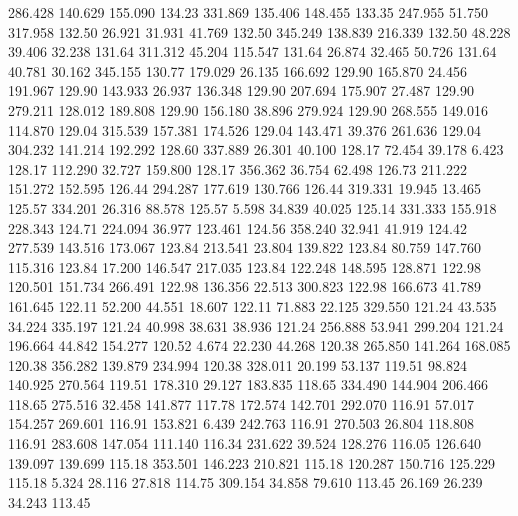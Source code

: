  286.428  140.629  155.090       134.23
 331.869  135.406  148.455       133.35
 247.955   51.750  317.958       132.50
  26.921   31.931   41.769       132.50
 345.249  138.839  216.339       132.50
  48.228   39.406   32.238       131.64
 311.312   45.204  115.547       131.64
  26.874   32.465   50.726       131.64
  40.781   30.162  345.155       130.77
 179.029   26.135  166.692       129.90
 165.870   24.456  191.967       129.90
 143.933   26.937  136.348       129.90
 207.694  175.907   27.487       129.90
 279.211  128.012  189.808       129.90
 156.180   38.896  279.924       129.90
 268.555  149.016  114.870       129.04
 315.539  157.381  174.526       129.04
 143.471   39.376  261.636       129.04
 304.232  141.214  192.292       128.60
 337.889   26.301   40.100       128.17
  72.454   39.178    6.423       128.17
 112.290   32.727  159.800       128.17
 356.362   36.754   62.498       126.73
 211.222  151.272  152.595       126.44
 294.287  177.619  130.766       126.44
 319.331   19.945   13.465       125.57
 334.201   26.316   88.578       125.57
   5.598   34.839   40.025       125.14
 331.333  155.918  228.343       124.71
 224.094   36.977  123.461       124.56
 358.240   32.941   41.919       124.42
 277.539  143.516  173.067       123.84
 213.541   23.804  139.822       123.84
  80.759  147.760  115.316       123.84
  17.200  146.547  217.035       123.84
 122.248  148.595  128.871       122.98
 120.501  151.734  266.491       122.98
 136.356   22.513  300.823       122.98
 166.673   41.789  161.645       122.11
  52.200   44.551   18.607       122.11
  71.883   22.125  329.550       121.24
  43.535   34.224  335.197       121.24
  40.998   38.631   38.936       121.24
 256.888   53.941  299.204       121.24
 196.664   44.842  154.277       120.52
   4.674   22.230   44.268       120.38
 265.850  141.264  168.085       120.38
 356.282  139.879  234.994       120.38
 328.011   20.199   53.137       119.51
  98.824  140.925  270.564       119.51
 178.310   29.127  183.835       118.65
 334.490  144.904  206.466       118.65
 275.516   32.458  141.877       117.78
 172.574  142.701  292.070       116.91
  57.017  154.257  269.601       116.91
 153.821    6.439  242.763       116.91
 270.503   26.804  118.808       116.91
 283.608  147.054  111.140       116.34
 231.622   39.524  128.276       116.05
 126.640  139.097  139.699       115.18
 353.501  146.223  210.821       115.18
 120.287  150.716  125.229       115.18
   5.324   28.116   27.818       114.75
 309.154   34.858   79.610       113.45
  26.169   26.239   34.243       113.45
